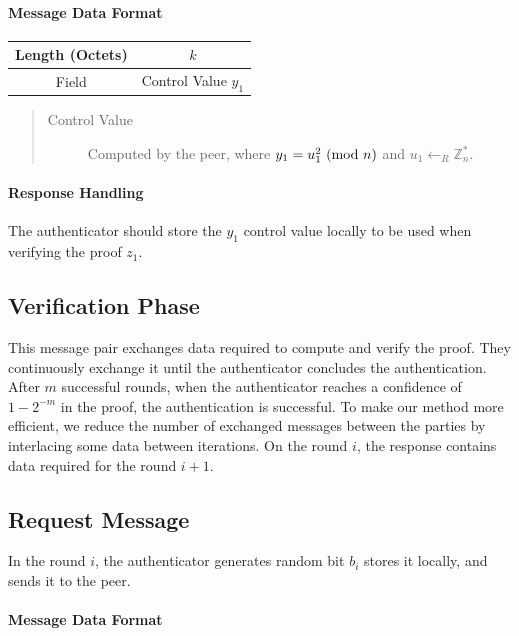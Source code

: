 \paragraph{Message Data Format}

\begin{center}
\begin{tabular}{|c|c|}
	\hline
	Length (Octets) & $k$ \\
	\hline
	Field & Control Value $y_1$\\
	\hline
\end{tabular}
\end{center}

\bigskip
\begin{quote}
\begin{description}
	\item[Control Value] Computed by the peer, where $y_1 = u_1^2 \ (\mathrm{mod}\ n)$ and $u_1 \leftarrow_R \mathbb{Z}^*_n$.
\end{description}
\end{quote}

\paragraph{Response Handling}
The authenticator should store the $y_1$ control value locally to be used when verifying the proof $z_1$.

\subsection{Verification Phase}
This message pair exchanges data required to compute and verify the proof.
They continuously exchange it until the authenticator concludes the authentication.
After $m$ successful rounds, when the authenticator reaches a confidence of $1 - 2^{-m}$ in the proof, the authentication is successful.
To make our method more efficient, we reduce the number of exchanged messages between the parties by interlacing some data between iterations.
On the round $i$, the response contains data required for the round $i+1$.


\subsection*{Request Message}
In the round $i$, the authenticator generates random bit $b_i$ stores it locally, and sends it to the peer.
\paragraph{Message Data Format}

